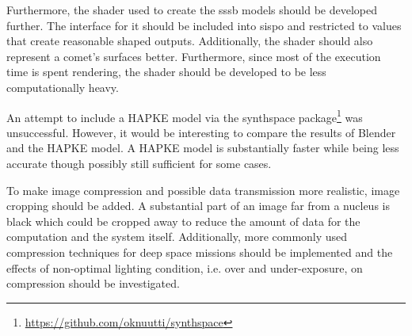 Furthermore, the shader used to create the \gls{sssb} models should be developed further. The interface for it should be included into \gls{sispo} and restricted to values that create reasonable shaped outputs. Additionally, the shader should also represent a comet's surfaces better. Furthermore, since most of the execution time is spent rendering, the shader should be developed to be less computationally heavy.

An attempt to include a HAPKE model via the synthspace package\footnote{\url{https://github.com/oknuutti/synthspace}} was unsuccessful. However, it would be interesting to compare the results of Blender and the HAPKE model. A HAPKE model is substantially faster while being less accurate though possibly still sufficient for some cases.

To make image compression and possible data transmission more realistic, image cropping should be added. A substantial part of an image far from a nucleus is black which could be cropped away to reduce the amount of data for the computation and the system itself. Additionally, more commonly used compression techniques for deep space missions should be implemented and the effects of non-optimal lighting condition, i.e. over and under-exposure, on compression should be investigated.